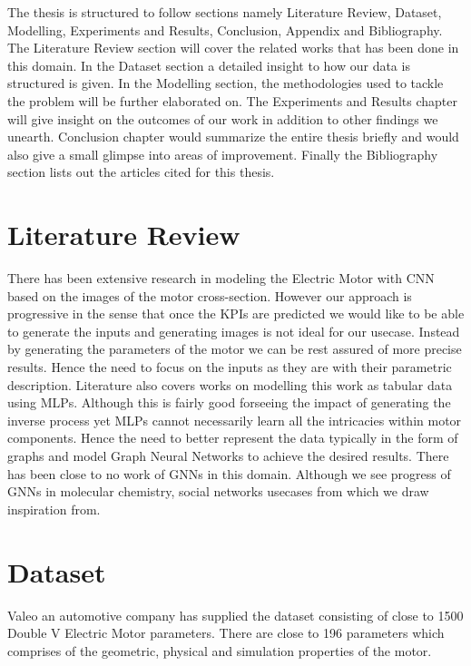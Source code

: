 \documentclass{report} %
\begin{document}
The thesis is structured to follow sections namely Literature Review, Dataset, Modelling, Experiments and Results, Conclusion, Appendix and Bibliography.\\
The Literature Review section will cover the related works that has been done in this domain. In the Dataset section a detailed insight to how our data is structured is given.
In the Modelling section, the methodologies used to tackle the problem will be further elaborated on. The Experiments and Results chapter will give insight on the outcomes of our work in addition to other findings we unearth. 
Conclusion chapter would summarize the entire thesis briefly and would also give a small glimpse into areas of improvement. Finally the Bibliography section lists out the articles cited for this thesis.\\
\newpage 

\chapter*{Literature Review} 
There has been extensive research in modeling the Electric Motor with CNN based on the images of the motor cross-section. 
However our approach is progressive in the sense that once the KPIs are predicted we would like to be able to generate the inputs and generating images is not ideal for our usecase.
Instead by generating the parameters of the motor we can be rest assured of more precise results. Hence the need to focus on the inputs as they are with their parametric description.
Literature also covers works on modelling this work as tabular data using MLPs. Although this is fairly good forseeing the impact of generating the inverse process yet MLPs cannot necessarily learn all the intricacies within motor components.
Hence the need to better represent the data typically in the form of graphs and model Graph Neural Networks to achieve the desired results. There has been close to no work of GNNs in this domain.
Although we see progress of GNNs in molecular chemistry, social networks usecases from which we draw inspiration from.

\newpage 

\chapter*{Dataset} 
Valeo an automotive company has supplied the dataset consisting of close to 1500 Double V Electric Motor parameters. 
There are close to 196 parameters which comprises of the geometric, physical and simulation properties of the motor.
\end{document}
